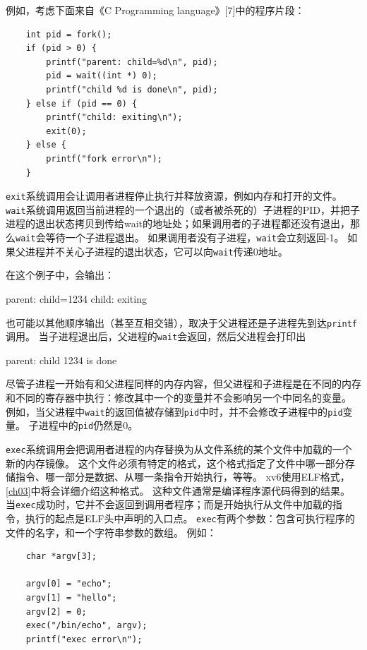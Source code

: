 例如，考虑下面来自《C Programming language》[7]中的程序片段：

\begin{lstlisting}
    int pid = fork();
    if (pid > 0) {
        printf("parent: child=%d\n", pid);
        pid = wait((int *) 0);
        printf("child %d is done\n", pid);
    } else if (pid == 0) {
        printf("child: exiting\n");
        exit(0);
    } else {
        printf("fork error\n");
    }
\end{lstlisting}

\texttt{exit}系统调用会让调用者进程停止执行并释放资源，例如内存和打开的文件。
\texttt{wait}系统调用返回当前进程的一个退出的（或者被杀死的）子进程的PID，并把子进程的退出状态拷贝到传给wait的地址处；如果调用者的子进程都还没有退出，那么\texttt{wait}会等待一个子进程退出。
如果调用者没有子进程，\texttt{wait}会立刻返回-1。
如果父进程并不关心子进程的退出状态，它可以向\texttt{wait}传递0地址。

在这个例子中，会输出：
\begin{blacklisting}
    parent: child=1234
    child: exiting
\end{blacklisting}    

也可能以其他顺序输出（甚至互相交错），取决于父进程还是子进程先到达\texttt{printf}调用。
当子进程退出后，父进程的\texttt{wait}会返回，然后父进程会打印出
\begin{blacklisting}
    parent: child 1234 is done
\end{blacklisting}

尽管子进程一开始有和父进程同样的内存内容，但父进程和子进程是在不同的内存和不同的寄存器中执行：修改其中一个的变量并不会影响另一个中同名的变量。
例如，当父进程中\texttt{wait}的返回值被存储到\texttt{pid}中时，并不会修改子进程中的\texttt{pid}变量。
子进程中的\texttt{pid}仍然是0。

\texttt{exec}系统调用会把调用者进程的内存替换为从文件系统的某个文件中加载的一个新的内存镜像。
这个文件必须有特定的格式，这个格式指定了文件中哪一部分存储指令、哪一部分是数据、从哪一条指令开始执行，等等。
xv6使用ELF格式，\autoref{ch03}中将会详细介绍这种格式。
这种文件通常是编译程序源代码得到的结果。
当\texttt{exec}成功时，它并不会返回到调用者程序；而是开始执行从文件中加载的指令，执行的起点是ELF头中声明的入口点。
\texttt{exec}有两个参数：包含可执行程序的文件的名字，和一个字符串参数的数组。
例如：
\begin{lstlisting}
    char *argv[3];

    argv[0] = "echo";
    argv[1] = "hello";
    argv[2] = 0;
    exec("/bin/echo", argv);
    printf("exec error\n");
\end{lstlisting}

